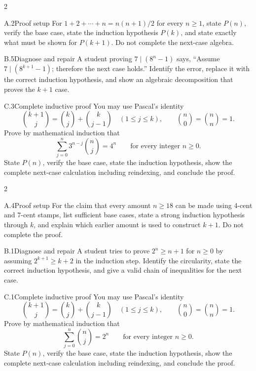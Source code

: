 \documentclass[9pt]{extarticle}
\begin{document}
\CoreWorkArea
\FormBreak
{}
\begin{multicols}{2}
\begin{CompactCoreProblem}{A.2}{Proof setup}
For $1+2+\cdots+n=n(n+1)/2$ for every $n\ge1$, state $P(n)$, verify the base case, state the induction hypothesis $P(k)$, and state exactly what must be shown for $P(k+1)$. Do not complete the next-case algebra.
\end{CompactCoreProblem}
\begin{CompactCoreProblem}{B.5}{Diagnose and repair}
A student proving $7\mid(8^n-1)$ says, “Assume $7\mid(8^{k+1}-1)$; therefore the next case holds.” Identify the error, replace it with the correct induction hypothesis, and show an algebraic decomposition that proves the $k+1$ case.
\end{CompactCoreProblem}
\end{multicols}
\begin{CompactCoreProblem}{C.3}{Complete inductive proof}
You may use Pascal's identity
\[
\binom{k+1}{j}=\binom{k}{j}+\binom{k}{j-1}
\quad(1\le j\le k),\qquad
\binom{n}{0}=\binom{n}{n}=1.
\]
Prove by mathematical induction that
\[
\sum_{j=0}^{n} 3^{n-j}\binom{n}{j}=4^n\qquad\text{for every integer }n\ge0.
\]
State $P(n)$, verify the base case, state the induction hypothesis, show the complete next-case calculation including reindexing, and conclude the proof.
\end{CompactCoreProblem}
\CoreWorkArea
\FormBreak
{}
\begin{multicols}{2}
\begin{CompactCoreProblem}{A.4}{Proof setup}
For the claim that every amount $n\ge18$ can be made using 4-cent and 7-cent stamps, list sufficient base cases, state a strong induction hypothesis through $k$, and explain which earlier amount is used to construct $k+1$. Do not complete the proof.
\end{CompactCoreProblem}
\begin{CompactCoreProblem}{B.1}{Diagnose and repair}
A student tries to prove $2^n\ge n+1$ for $n\ge0$ by assuming $2^{k+1}\ge k+2$ in the induction step. Identify the circularity, state the correct induction hypothesis, and give a valid chain of inequalities for the next case.
\end{CompactCoreProblem}
\end{multicols}
\begin{CompactCoreProblem}{C.1}{Complete inductive proof}
You may use Pascal's identity
\[
\binom{k+1}{j}=\binom{k}{j}+\binom{k}{j-1}
\quad(1\le j\le k),\qquad
\binom{n}{0}=\binom{n}{n}=1.
\]
Prove by mathematical induction that
\[
\sum_{j=0}^{n}\binom{n}{j}=2^n\qquad\text{for every integer }n\ge0.
\]
State $P(n)$, verify the base case, state the induction hypothesis, show the complete next-case calculation including reindexing, and conclude the proof.
\end{CompactCoreProblem}
\end{document}
